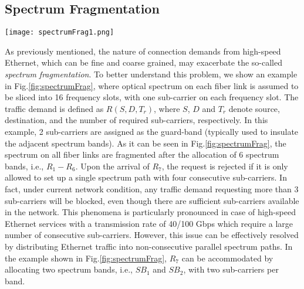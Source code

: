 \documentclass[conference]{IEEEtran}
\begin{document}
   
 \subsection{Spectrum Fragmentation}
 \begin{figure*}[ht]
	\centering
		\texttt{[image: spectrumFrag1.png]}
	\caption{An illustrative example of spectrum fragmentation and a solution with two non-consequitve spectrum slices} \vspace{-0.3cm}	\label{fig:spectrumFrag}
\end{figure*}
\par As previously mentioned, the nature of connection demands from high-speed Ethernet, which can be fine and 
coarse grained, may exacerbate the so-called \emph{spectrum fragmentation}. To better understand this problem,  we 
show an  example  in Fig.\ref{fig:spectrumFrag}, where optical spectrum on each fiber link is assumed to be  sliced 
into 16 frequency slots, with one sub-carrier on each frequency slot.  The traffic demand is defined as  $R(S, D,T_r)$, 
where $S$, $D$ and $T_r$ denote source, destination, and the number of required  sub-carriers, respectively. In this 
example, 2 sub-carriers are assigned as the guard-band (typically used to insulate the adjacent spectrum bands).  As it 
can be seen in Fig.\ref{fig:spectrumFrag}, the spectrum  on all fiber links are  fragmented after the allocation of 6 
spectrum bands, i.e., $R_1-R_6$.  
 Upon the arrival of $R_7$, the   request is rejected  if it is only allowed to set up a single spectrum path with four consecutive 
 sub-carriers. In fact, under current network condition, any traffic demand requesting more than 3 sub-carriers will be 
 blocked, even  though there are sufficient sub-carriers available in the network. This phenomena is particularly 
 pronounced in case of  high-speed Ethernet services  with a transmission rate of   40/100 Gbps which require  a large 
 number of consecutive sub-carriers. However, this issue can be effectively resolved by  distributing Ethernet 
 traffic into non-consecutive parallel spectrum paths.    In the example shown in Fig.\ref{fig:spectrumFrag}, $R_7$ can 
 be accommodated by allocating two spectrum bands, i.e., $SB_1$ and $SB_2$, with two sub-carriers per band.
 

 

       
           



 
 
 
\end{document}
